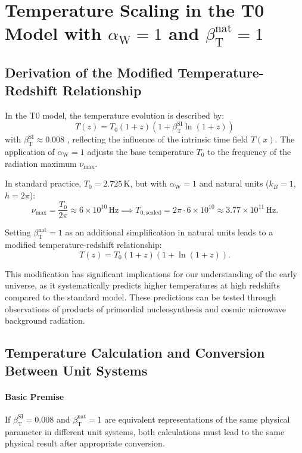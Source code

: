 \documentclass[12pt,a4paper]{article}
\newcommand{\Tfield}{T(x)}
\newcommand{\betaT}{\beta_{\text{T}}}
\newcommand{\alphaW}{\alpha_{\text{W}}}
\begin{document}
	\section{Temperature Scaling in the T0 Model with \(\alphaW = 1\) and \(\betaT^{\text{nat}} = 1\)}
	\label{sec:temperature_scaling}
	
	\subsection{Derivation of the Modified Temperature-Redshift Relationship}
	\label{subsec:modified_temp_redshift}
	
	In the T0 model, the temperature evolution is described by:
	\begin{equation}
		T(z) = T_0 (1 + z) (1 + \betaT^{\text{SI}} \ln(1 + z))
	\end{equation}
	with \(\betaT^{\text{SI}} \approx 0.008\) \cite{pascher_messdifferenzen_2025}, reflecting the influence of the intrinsic time field \(\Tfield\). The application of \(\alphaW = 1\) adjusts the base temperature \(T_0\) to the frequency of the radiation maximum \(\nu_{\text{max}}\).
	
	In standard practice, \(T_0 = 2.725 \, \text{K}\), but with \(\alphaW = 1\) and natural units (\(k_B = 1\), \(h = 2\pi\)):
	\[
	\nu_{\text{max}} = \frac{T_0}{2\pi} \approx 6 \times 10^{10} \, \text{Hz} \implies T_{0,\text{scaled}} = 2\pi \cdot 6 \times 10^{10} \approx 3.77 \times 10^{11} \, \text{Hz}.
	\]
	
	Setting \(\betaT^{\text{nat}} = 1\) as an additional simplification in natural units leads to a modified temperature-redshift relationship:
	\[
	T(z) = T_0 (1 + z) (1 + \ln(1 + z)).
	\]
	
	This modification has significant implications for our understanding of the early universe, as it systematically predicts higher temperatures at high redshifts compared to the standard model. These predictions can be tested through observations of products of primordial nucleosynthesis and cosmic microwave background radiation.
	
	\subsection{Temperature Calculation and Conversion Between Unit Systems}
	\label{subsec:temp_calculation}
	
	\paragraph{Basic Premise}
	If \(\betaT^{\text{SI}} = 0.008\) and \(\betaT^{\text{nat}} = 1\) are equivalent representations of the same physical parameter in different unit systems, both calculations must lead to the same physical result after appropriate conversion.
	
\end{document}
